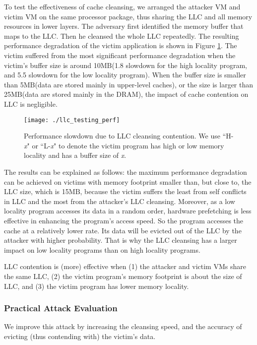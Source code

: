 \documentclass{sig-alternate}
\newcommand{\bheading}[1]{{\vspace{2pt}\noindent{\textbf{#1}}\hspace{2pt}}}
\newcommand{\mbytes}{\ensuremath{\mathrm{MB}}\xspace}
\begin{document}
To test the effectiveness of cache cleansing, we arranged the attacker VM and 
victim VM on the same processor package, thus sharing the LLC and all memory 
resources in lower layers.  The adversary first identified the memory buffer that 
maps to the LLC. Then he cleansed the whole LLC repeatedly. The resulting 
performance degradation of the victim application is shown in Figure \ref{fig:llc_testing_perf}. The victim suffered from the most significant performance 
degradation when the victim's buffer size is around 10\mbytes (1.8 
slowdown for the high locality program, and 5.5 slowdown for the low 
locality program).  When the buffer size is smaller than 5\mbytes (data are 
stored mainly in upper-level caches), or the size is larger than 25\mbytes (data 
are stored mainly in the DRAM), the impact of cache contention on LLC is 
negligible. 

\begin{figure}[ht]
\centerline{\mbox{\texttt{[image: ./llc\_testing\_perf]}} }
\caption{Performance slowdown due to LLC cleansing contention. We use ``H-\emph{x}" or ``L-\emph{x}" to denote the victim program has high or low memory locality and has a buffer size of \emph{x}.}
\label{fig:llc_testing_perf}
\end{figure}

The results can be explained as follows: the maximum performance degradation 
can be achieved on victims with memory footprint smaller than, but
close to, the LLC size, which is 15\mbytes, because
the victim suffers the least from self conflicts in 
LLC and the most from the attacker's LLC cleansing. Moreover, as a low locality 
program accesses its data in a random order, hardware prefetching is less effective in enhancing the program's access speed. So the program accesses the cache at a relatively lower rate. Its data will be evicted out of the LLC by the attacker with higher probability.
That is why the LLC cleansing has a larger impact on low locality programs
than on high locality programs.

\bheading{Takeaways.} 
LLC contention is (more) effective when (1) the attacker and victim VMs share
the same LLC, (2) the victim program's memory footprint is about the
size of LLC, and (3) the victim program has lower memory locality.


\subsubsection{Practical Attack Evaluation}
We improve this attack by increasing the cleansing speed, and the accuracy 
of evicting (thus contending with) the victim's data. 
\end{document}
